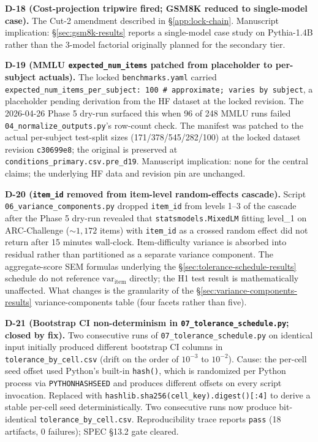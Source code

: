 \documentclass[11pt]{article}
\begin{document}
\textbf{D-18 (Cost-projection tripwire fired; GSM8K reduced to single-model case).} The Cut-2 amendment described in §\ref{app:lock-chain}. Manuscript implication: §\ref{sec:gsm8k-results} reports a single-model case study on Pythia-1.4B rather than the 3-model factorial originally planned for the secondary tier.

\textbf{D-19 (MMLU \texttt{expected\_num\_items} patched from placeholder to per-subject actuals).} The locked \texttt{benchmarks.yaml} carried \texttt{expected\_num\_items\_per\_subject: 100  \# approximate; varies by subject}, a placeholder pending derivation from the HF dataset at the locked revision. The 2026-04-26 Phase 5 dry-run surfaced this when 96 of 248 MMLU runs failed \texttt{04\_normalize\_outputs.py}'s row-count check. The manifest was patched to the actual per-subject test-split sizes (171/378/545/282/100) at the locked dataset revision \texttt{c30699e8}; the original is preserved at \texttt{conditions\_primary.csv.pre\_d19}. Manuscript implication: none for the central claims; the underlying HF data and revision pin are unchanged.

\textbf{D-20 (\texttt{item\_id} removed from item-level random-effects cascade).} Script \texttt{06\_variance\_components.py} dropped \texttt{item\_id} from levels 1--3 of the cascade after the Phase 5 dry-run revealed that \texttt{statsmodels.MixedLM} fitting level\_1 on ARC-Challenge ($\sim 1{,}172$ items) with \texttt{item\_id} as a crossed random effect did not return after 15 minutes wall-clock. Item-difficulty variance is absorbed into residual rather than partitioned as a separate variance component. The aggregate-score SEM formulas underlying the §\ref{sec:tolerance-schedule-results} schedule do not reference $\mathrm{var}_{\mathrm{item}}$ directly; the H1 test result is mathematically unaffected. What changes is the granularity of the §\ref{sec:variance-components-results} variance-components table (four facets rather than five).

\textbf{D-21 (Bootstrap CI non-determinism in \texttt{07\_tolerance\_schedule.py}; closed by fix).} Two consecutive runs of \texttt{07\_tolerance\_schedule.py} on identical input initially produced different bootstrap CI columns in \texttt{tolerance\_by\_cell.csv} (drift on the order of $10^{-3}$ to $10^{-2}$). Cause: the per-cell seed offset used Python's built-in \texttt{hash()}, which is randomized per Python process via \texttt{PYTHONHASHSEED} and produces different offsets on every script invocation. Replaced with \texttt{hashlib.sha256(cell\_key).digest()[:4]} to derive a stable per-cell seed deterministically. Two consecutive runs now produce bit-identical \texttt{tolerance\_by\_cell.csv}. Reproducibility trace reports \texttt{pass} (18 artifacts, 0 failures); SPEC §13.2 gate cleared.
\end{document}
